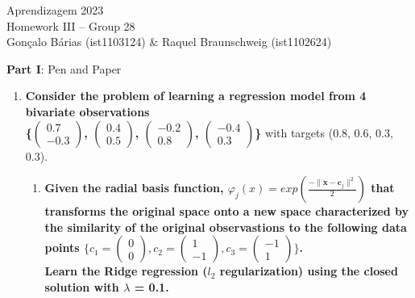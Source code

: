 \documentclass[12pt]{article}
\begin{document}
  \begin{center}
  \large{Aprendizagem 2023}\\
  Homework III -- Group 28\\
  \vskip 0.3cm
  Gonçalo Bárias (ist1103124) \& Raquel Braunschweig (ist1102624)\vskip 1cm

  \large{\textbf{Part I}: Pen and Paper}\normalsize
  \end{center}


  \begin{enumerate}[leftmargin=\labelsep]
      \item \textbf{Consider the problem of learning a regression model from 4 bivariate observations \\
       \{$\begin{pmatrix} 0.7 \\ -0.3 \end{pmatrix}$, $\begin{pmatrix} 0.4 \\ 0.5 \end{pmatrix}$, $\begin{pmatrix} -0.2 \\ 0.8 \end{pmatrix}$, 
        $\begin{pmatrix} -0.4 \\ 0.3 \end{pmatrix}$\}} with targets (0.8, 0.6, 0.3, 0.3).

      \begin{enumerate}
        \item \textbf{Given the radial basis function, $\varphi_j(x) = exp ({ \frac{-\| \mathbf{x} - \mathbf{c}_j \|^2}{2} })$ that transforms
                 the original space onto a new space characterized by the similarity of the original observastions to the following data points
                 $\{ c_1 = \begin{pmatrix} 0 \\ 0 \end{pmatrix}, c_2 = \begin{pmatrix} 1 \\ -1 \end{pmatrix}, c_3 = \begin{pmatrix} -1 \\ 1 \end{pmatrix}\}$. \\
                 Learn the Ridge regression ($l_2$ regularization) using the closed solution with $\lambda$ = 0.1.}


\end{enumerate}
\end{enumerate}
\end{document}
